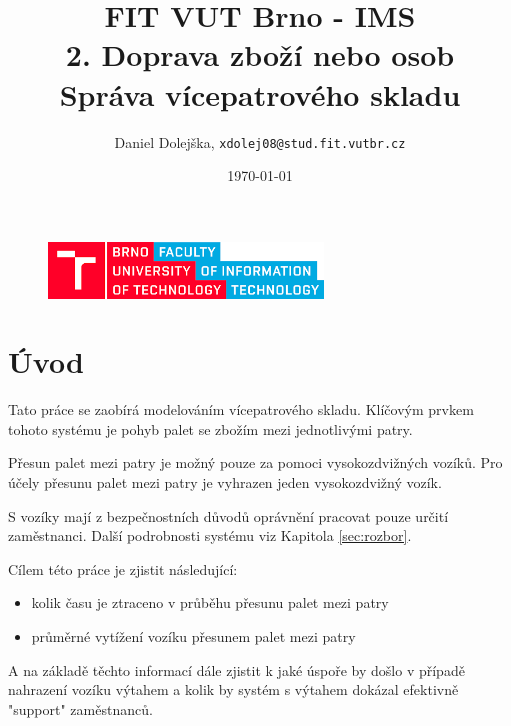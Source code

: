 \documentclass[11pt]{article}
\title{\textbf{FIT VUT Brno - IMS}\\
	2. Doprava zboží nebo osob\\
	Správa vícepatrového skladu}
\author{Daniel Dolejška, \texttt{xdolej08@stud.fit.vutbr.cz}}
\date{\today}
\begin{document}
	
	\maketitle
	\vfill
	\begin{figure}[hb]
		\centering
		\includegraphics[width=0.65\textwidth]{images/fit-vutbr.png}
	\end{figure}
	
	\newpage
	\tableofcontents
	
	
	\newpage
	
	\section{Úvod}
	Tato práce se zaobírá modelováním\cite[str.~8]{ims-prezentace} vícepatrového skladu.
	Klíčovým prvkem tohoto systému\cite[str.~7]{ims-prezentace} je pohyb palet se zbožím mezi jednotlivými patry.
	
	Přesun palet mezi patry je možný pouze za pomoci vysokozdvižných vozíků.
	Pro účely přesunu palet mezi patry je vyhrazen jeden vysokozdvižný vozík.
	
	S vozíky mají z bezpečnostních důvodů oprávnění pracovat pouze určití zaměstnanci.
	Další podrobnosti systému viz Kapitola \ref{sec:rozbor}.
	
	Cílem této práce je zjistit následující:
	\begin{itemize}
		\item kolik času je ztraceno v průběhu přesunu palet mezi patry
		\item průměrné vytížení vozíku přesunem palet mezi patry
	\end{itemize}

	A na základě těchto informací dále zjistit k jaké úspoře by došlo v případě nahrazení vozíku výtahem a kolik by systém s výtahem dokázal efektivně "support" zaměstnanců.
\end{document}
